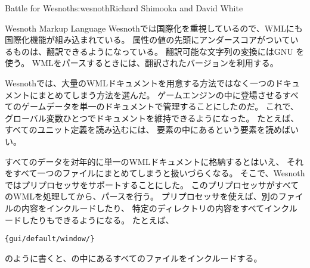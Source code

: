 \begin{aosachapter}{Battle for Wesnoth}{s:wesnoth}{Richard Shimooka and David White}
\begin{aosasect1}{Wesnoth Markup Language}
Wesnothでは国際化を重視しているので、WMLにも国際化機能が組み込まれている。
属性の値の先頭にアンダースコアがついているものは、翻訳できるようになっている。
翻訳可能な文字列の変換にはGNU を使う。
WMLをパースするときには、翻訳されたバージョンを利用する。

Wesnothでは、大量のWMLドキュメントを用意する方法ではなく一つのドキュメントにまとめてしまう方法を選んだ。
ゲームエンジンの中に登場させるすべてのゲームデータを単一のドキュメントで管理することにしたのだ。
これで、グローバル変数ひとつでドキュメントを維持できるようになった。
たとえば、すべてのユニット定義を読み込むには、
要素の中にあるという要素を読めばいい。

すべてのデータを対年的に単一のWMLドキュメントに格納するとはいえ、
それをすべて一つのファイルにまとめてしまうと扱いづらくなる。
そこで、Wesnothではプリプロセッサをサポートすることにした。
このプリプロセッサがすべてのWMLを処理してから、パースを行う。
プリプロセッサを使えば、別のファイルの内容をインクルードしたり、
特定のディレクトリの内容をすべてインクルードしたりもできるようになる。
たとえば、

\begin{verbatim}
{gui/default/window/}
\end{verbatim}

\noindent
のように書くと、の中にあるすべてのファイルをインクルードする。


\end{aosasect1}
\end{aosachapter}
